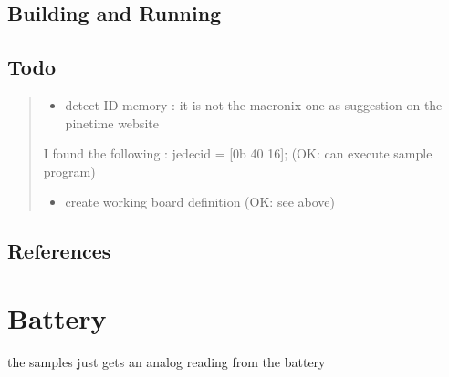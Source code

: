 \documentclass[letterpaper,10pt,english]{sphinxmanual}
\begin{document}
\subsection{Building and Running}
\label{\detokenize{drivers/spinor:building-and-running}}
\begin{sphinxVerbatim}[commandchars=\\\{\}]
\end{sphinxVerbatim}


\subsection{Todo}
\label{\detokenize{drivers/spinor:todo}}\begin{quote}
\begin{itemize}
\item {} 
detect ID memory  : it is not the macronix one as suggestion on the pinetime website

\end{itemize}

I found the following : jedec\sphinxhyphen{}id = {[}0b 40 16{]}; (OK: can execute sample program)
\begin{itemize}
\item {} 
create working board definition (OK: see above)

\end{itemize}
\end{quote}


\subsection{References}
\label{\detokenize{drivers/spinor:references}}


\section{Battery}
\label{\detokenize{drivers/battery:battery}}\label{\detokenize{drivers/battery::doc}}
the samples just gets an analog reading from the battery

\begin{sphinxVerbatim}[commandchars=\\\{\}]
\end{sphinxVerbatim}
\end{document}
